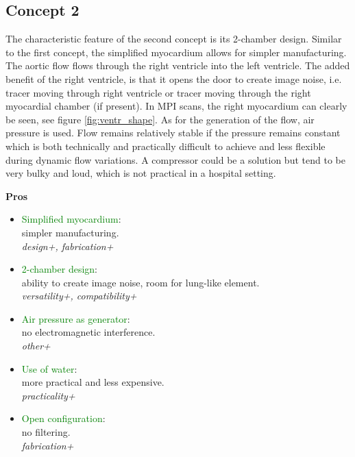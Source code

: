 \subsection{Concept 2}
The characteristic feature of the second concept is its 2-chamber design. Similar to the first concept, the simplified myocardium allows for simpler manufacturing. The aortic flow flows through the right ventricle into the left ventricle. The added benefit of the right ventricle, is that it opens the door to create image noise, i.e. tracer moving through right ventricle or tracer moving through the right myocardial chamber (if present). In MPI scans, the right myocardium can clearly be seen, see figure \ref{fig:ventr_shape}. As for the generation of the flow, air pressure is used. Flow remains relatively stable if the pressure remains constant which is both technically and practically difficult to achieve and less flexible during dynamic flow variations. A compressor could be a solution but tend to be very bulky and loud, which is not practical in a hospital setting.
\begin{minipage}[t]{0.5\textwidth}
\centering\textbf{Pros}
\begin{itemize} [noitemsep]
	\item \textcolor{green}{Simplified myocardium}: \\ simpler manufacturing. \\ \textit{design+, fabrication+}
	\item \textcolor{green}{2-chamber design}: \\ ability to create image noise, room for lung-like element. \\ \textit{versatility+, compatibility+}
	\item \textcolor{green}{Air pressure as generator}: \\ no electromagnetic interference. \\ \textit{other+}
	\item \textcolor{green}{Use of water}: \\ more practical and less expensive. \\ \textit{practicality+}
	\item \textcolor{green}{Open configuration}: \\ no filtering. \\ \textit{fabrication+}
\end{itemize}
\end{minipage}%
